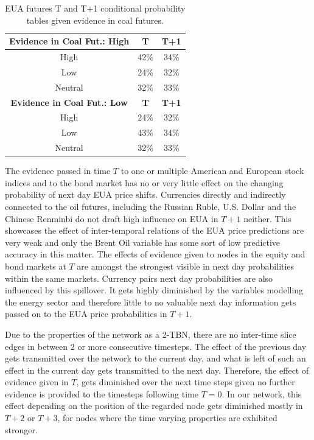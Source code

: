 \documentclass[12pt, letterpaper]{article}
\begin{document}
\begin{table}[ht]
\centering
\small
\begin{tabular}{|c|c|c|}
\hline
\textbf{Evidence in Coal Fut.: High} & \textbf{T} & \textbf{T+1} \\
\hline
High & 42\% & 34\% \\
Low & 24\% & 32\% \\
Neutral & 32\% & 33\% \\
\hline
\textbf{Evidence in Coal Fut.: Low} & \textbf{T} & \textbf{T+1} \\
\hline
High & 24\% & 32\% \\
Low & 43\% & 34\% \\
Neutral & 32\% & 33\% \\
\hline
\end{tabular}
\caption{EUA futures T and T+1 conditional probability tables given evidence in coal futures.}
\label{tab:evidDBNcoal}
\end{table}

The evidence passed in time $T$ to one or multiple American and European stock indices and to the bond market has no or very little effect on the changing probability of next day EUA price shifts. Currencies directly and indirectly connected to the oil futures, including the Russian Ruble, U.S. Dollar and the Chinese Renminbi do not draft high influence on EUA in $T+1$ neither. This showcases the effect of inter-temporal relations of the EUA price predictions are very weak and only the Brent Oil variable has some sort of low predictive accuracy in this matter. The effects of evidence given to nodes in the equity and bond markets at $T$ are amongst the strongest visible in next day probabilities within the same markets. Currency pairs next day probabilities are also influenced by this spillover. It gets highly diminished by the variables modelling the energy sector and therefore little to no valuable next day information gets passed on to the EUA price probabilities in $T+1$.

Due to the properties of the network as a 2-TBN, there are no inter-time slice edges in between 2 or more consecutive timesteps. The effect of the previous day gets transmitted over the network to the current day, and what is left of such an effect in the current day gets transmitted to the next day. Therefore, the effect of evidence given in $T$, gets diminished over the next time steps given no further evidence is provided to the timesteps following time $T=0$. In our network, this effect depending on the position of the regarded node gets diminished mostly in $T+2$ or $T+3$, for nodes where the time varying properties are exhibited stronger.
\end{document}
